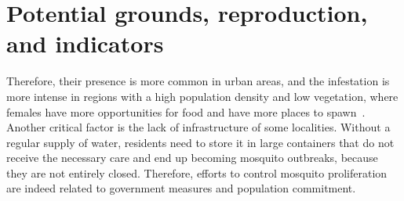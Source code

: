\section{Potential grounds, reproduction, and indicators}
Therefore, their presence is more common in urban areas, and the infestation is more intense in regions with a high population density and low vegetation, where females have more opportunities for food and have more places to spawn~\cite{lambrechts2012vector}.
Another critical factor is the lack of infrastructure of some localities.
Without a regular supply of water, residents need to store it in large containers that do not receive the necessary care and end up becoming mosquito outbreaks, because they are not entirely closed.
Therefore, efforts to control mosquito proliferation are indeed related to government measures and population commitment.

